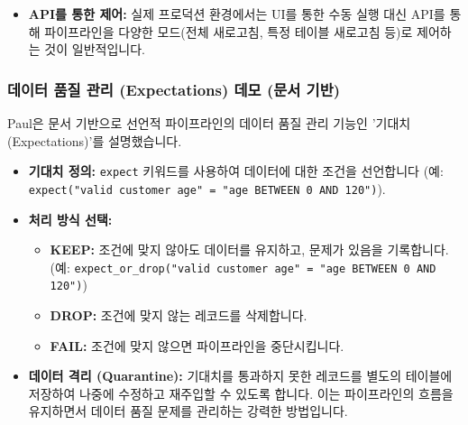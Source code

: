 \documentclass[11pt,a4paper]{article}
\theoremstyle{definition}
\begin{document}
\begin{enumerate}
\begin{itemize}
\begin{itemize}
        \item \textbf{선택적 테이블 새로고침:} 파이프라인 내의 특정 테이블만 선택하여 새로고침할 수 있습니다.
        \item \textbf{이벤트 로그 (Event Log):} 파이프라인의 모든 작업(시작, 리소스 대기, 초기화, 테이블 생성, 실행 등)이 기록되어 문제 발생 시 디버깅에 활용됩니다. 이 로그는 Delta 테이블에 저장되어 완전한 가시성을 제공합니다.
        \item \textbf{쿼리 기록 (Query History):} 엔진이 자동으로 생성하고 실행한 SQL 쿼리 및 실행 계획을 확인할 수 있습니다. 이를 통해 성능 분석 및 최적화에 필요한 정보를 얻을 수 있습니다.
    \end{itemize}
    \item \textbf{API를 통한 제어:} 실제 프로덕션 환경에서는 UI를 통한 수동 실행 대신 API를 통해 파이프라인을 다양한 모드(전체 새로고침, 특정 테이블 새로고침 등)로 제어하는 것이 일반적입니다.
\end{itemize}

\subsubsection{데이터 품질 관리 (Expectations) 데모 (문서 기반)}
Paul은 문서 기반으로 선언적 파이프라인의 데이터 품질 관리 기능인 '기대치(Expectations)'를 설명했습니다.

\begin{itemize}
    \item \textbf{기대치 정의:} \texttt{expect} 키워드를 사용하여 데이터에 대한 조건을 선언합니다 (예: \texttt{expect("valid customer age" = "age BETWEEN 0 AND 120")}).
    \item \textbf{처리 방식 선택:}
    \begin{itemize}
        \item \textbf{KEEP:} 조건에 맞지 않아도 데이터를 유지하고, 문제가 있음을 기록합니다. (예: \texttt{expect_or_drop("valid customer age" = "age BETWEEN 0 AND 120")})
        \item \textbf{DROP:} 조건에 맞지 않는 레코드를 삭제합니다.
        \item \textbf{FAIL:} 조건에 맞지 않으면 파이프라인을 중단시킵니다.
    \end{itemize}
    \item \textbf{데이터 격리 (Quarantine):} 기대치를 통과하지 못한 레코드를 별도의 테이블에 저장하여 나중에 수정하고 재주입할 수 있도록 합니다. 이는 파이프라인의 흐름을 유지하면서 데이터 품질 문제를 관리하는 강력한 방법입니다.
\end{itemize}


\end{enumerate}
\end{document}

